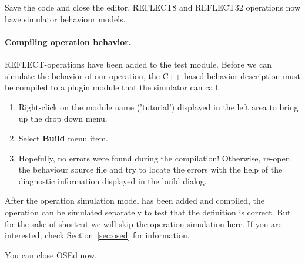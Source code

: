 \documentclass[a4paper,twoside]{tceusermanual}
\begin{document}
Save the code and close the editor. REFLECT8 and REFLECT32 operations
now have simulator behaviour models.

\paragraph{Compiling operation behavior.} REFLECT-operations have been
added to the test module. Before we can simulate the behavior of our
operation, the C++-based behavior description must be compiled to a plugin
module that the simulator can call.

\begin{enumerate}
\item%
  Right-click on the module name ('tutorial') displayed in the left area to bring up the
  drop down menu.
\item%
  Select \textbf{Build} menu item. 
\item%
  Hopefully, no errors were found during the compilation! Otherwise, re-open
  the behaviour source file and try to locate the errors with the
  help of the diagnostic information displayed in the build dialog.
\end{enumerate}

After the operation simulation model has been added and compiled, the operation
can be simulated separately to test that the definition is correct. But for the
sake of shortcut we will skip the operation simulation here. If you are interested,
check Section~\ref{sec:osed} for information.

You can close OSEd now.
\end{document}
